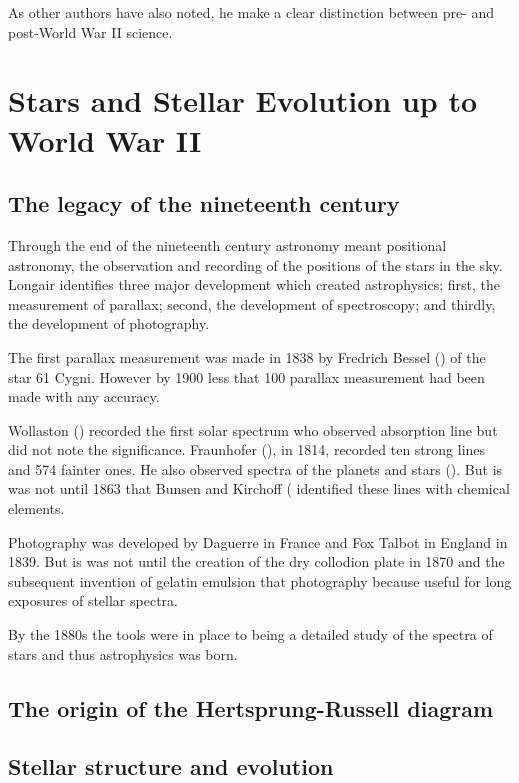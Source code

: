 As other authors have also noted, he make a clear distinction between
pre- and post-World War II science.


\section{Stars and Stellar Evolution up to World War II}

\subsection{The legacy of the nineteenth century}

Through the end of the nineteenth century astronomy
meant positional astronomy, the observation and recording of the
positions of the stars in the sky.  Longair identifies three major
development which created astrophysics; first, the measurement of
parallax; second, the development of spectroscopy; and thirdly, the
development of photography.

The first parallax measurement was made in 1838 by Fredrich
Bessel (\cite{Bessel1839}) of the star 61 Cygni. However by 1900 less
that 100 parallax measurement had been made with any accuracy.

Wollaston (\cite{Wollaston1802}) recorded the first solar spectrum who
observed absorption line but did not note the significance.
Fraunhofer (\cite{Fraunhofer1817}), in 1814, recorded ten strong lines
and 574 fainter ones. He also observed spectra of the planets and
stars (\cite{Fraunhofer1823}). But is was not until 1863 that Bunsen
and Kirchoff (\cite{Kirchoff1861} identified these lines with chemical
elements.

Photography was developed by Daguerre in France and Fox Talbot in
England in 1839. But is was not until the creation of the dry
collodion plate in 1870 and the subsequent invention of gelatin
emulsion that photography because useful for long exposures of stellar
spectra.

By the 1880s the tools were in place to being a
detailed study of the spectra of stars and thus astrophysics was born.


\subsection{The origin of the Hertsprung-Russell diagram}


\subsection{Stellar structure and evolution}

